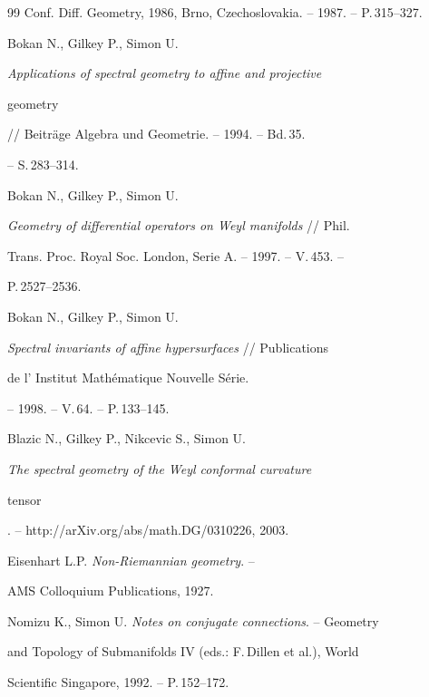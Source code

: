 \begin{thebibliography}{99}
Conf. Diff. Geometry, 1986, Brno, Czechoslovakia. -- 1987. -- P.\,315--327.




Bokan N., Gilkey P., Simon U.

{\it Applications of spectral geometry to affine and projective

geometry} // Beitr{\"a}ge Algebra und Geometrie. -- 1994. -- Bd.\,35.

-- S.\,283--314.




Bokan N., Gilkey P., Simon U.

{\it Geometry of differential operators on Weyl manifolds} // Phil.

Trans. Proc. Royal Soc. London, Serie A. -- 1997. -- V.\,453. --

P.\,2527--2536.




Bokan N., Gilkey P., Simon U.

{\it Spectral invariants of affine hypersurfaces} // Publications

de l' Institut  Math\'{e}matique Nouvelle S\'{e}rie.

-- 1998. -- V.\,64. -- P.\,133--145.




Blazic N., Gilkey P., Nikcevic S., Simon U.

{\it The spectral geometry of the Weyl conformal curvature

tensor}. -- http://arXiv.org/abs/math.DG/0310226, 2003.




Eisenhart L.P. {\it Non-Riemannian geometry}. --

AMS Colloquium Publications, 1927.




Nomizu K., Simon U. {\it Notes on conjugate connections}. -- Geometry

and Topology of Submanifolds IV (eds.: F.\,Dillen et al.), World 

Scientific Singapore, 1992. -- P.\,152--172.





\end{thebibliography}
